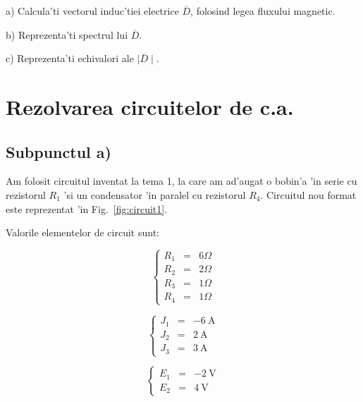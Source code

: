 \documentclass[titlepage, a4paper,12pt]{article}
\begin{document}
a) Calcula'ti vectorul induc'tiei electrice $\overline{D}$, folosind legea fluxului magnetic. \par
b) Reprezenta'ti spectrul lui $\overline{D}$. \par
c) Reprezenta'ti echivalori ale $\mid\overline{D}\mid$.

\newpage

\section{Rezolvarea circuitelor de c.a.}

\subsection{Subpunctul a)} \mbox{}

Am folosit circuitul inventat la tema 1, la care am ad'augat o bobin'a 'in serie cu rezistorul $R_1$ 'si un condensator 'in paralel cu rezistorul $R_4$. Circuitul nou format este reprezentat 'in Fig.~\ref{fig:circuit1}.

Valorile elementelor de circuit sunt:

\begin{multicols}{3}

\begin{equation}
\left\{
\begin{array}{ccl}
R_1 & = & 6\Omega \\
R_2 & = & 2\Omega\\
R_3 & = & 1\Omega \\
R_4 & = & 1\Omega
\end{array}  
\right. \nonumber %
\end{equation}

\columnbreak

\begin{equation}
\left\{
\begin{array}{ccl}
J_1 & = & \SI{-6}{\ampere} \\
J_2 & = & \SI{2}{\ampere} \\
J_3 & = & \SI{3}{\ampere}
\end{array}  
\right. \nonumber %
\end{equation}

\columnbreak

\begin{equation}
\left\{
\begin{array}{ccl}
E_1 & = & \SI{-2}{\volt} \\
E_2 & = & \SI{4}{\volt}
\end{array}  
\right. \nonumber %
\end{equation}

\end{multicols}
\end{document}
